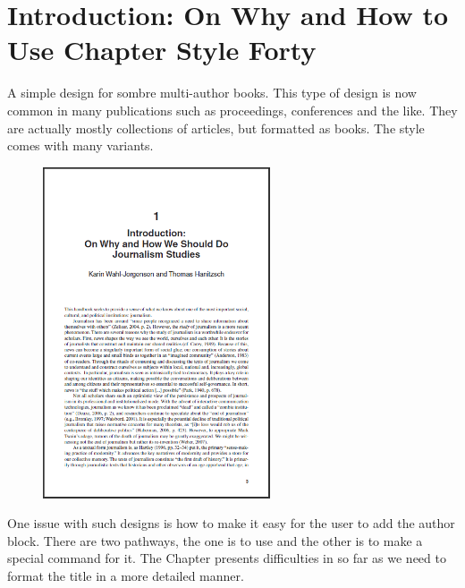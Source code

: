 

\chapter{Introduction: On Why and How to Use Chapter Style Forty}

\label{ch:style40}

A simple design for sombre multi-author books. This type of design is now common in many publications such as proceedings, conferences and the like. They are actually mostly collections of articles, but formatted as books. The style comes with many variants.

\begin{figure}[ht]
\centering
\includegraphics[width=0.6\textwidth]{./chapters/chapter40.png}
\end{figure}

One issue with such designs is how to make it easy for the user to add the author block. There are two pathways, the one is to use  and the other is to make a special command for it. The Chapter  presents difficulties in so far as we need to format the title in a more detailed manner.

